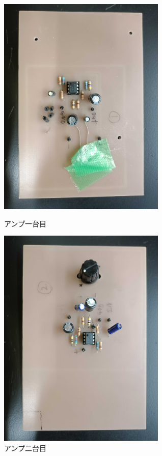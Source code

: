 \documentclass[report.tex]{subfiles}
\begin{document}
\begin{figure}[H]
	\begin{minipage}[b]{0.5\linewidth}
		\centering
		\includegraphics[width=8cm]{use/2.jpg}
		\caption{アンプ一台目}
		\label{fig:s_2}
	\end{minipage}
	\begin{minipage}[b]{0.5\linewidth}
		\centering
		\includegraphics[width=8cm]{use/3.jpg}
		\caption{アンプ二台目}
		\label{fig:s_3}
	\end{minipage}
\end{figure}
\end{document}
